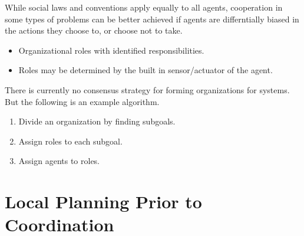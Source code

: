 \documentclass[twocolumn]{article}
\theoremstyle{plain}
\begin{document}
While social laws and conventions apply equally to all agents, cooperation in some types of problems can be better achieved if agents are differntially biased in the actions they choose to, or choose not to take.

\begin{itemize}
    \item Organizational roles with identified responsibilities.
    \item Roles may be determined by the built in sensor/actuator of the agent.
\end{itemize}

There is currently no consensus strategy for forming organizations for systems. But the following is an example algorithm.

\begin{enumerate}
    \item Divide an organization by finding subgoals.
    \item Assign roles to each subgoal.
    \item Assign agents to roles.
\end{enumerate}

\section{Local Planning Prior to Coordination}
\end{document}
